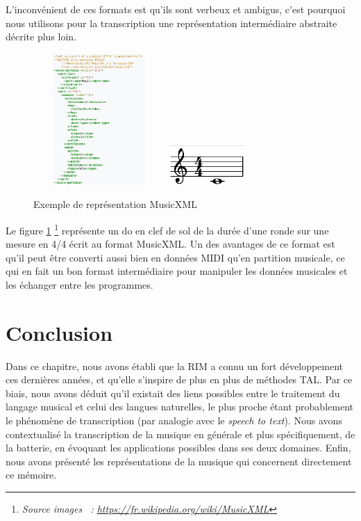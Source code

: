 L’inconvénient de ces formats est qu’ils sont verbeux et ambigus, c’est
pourquoi nous utilisons pour la transcription une représentation intermédiaire
abstraite décrite plus loin.


\begin{figure}[h]
	\centering
	\includegraphics[height=50mm, width=50mm]{
    z_images/1_contexte/6_musicxml_0.png}
    \includegraphics[height=15mm, width=30mm]{
    z_images/1_contexte/6_musicxml_1.png}
	\caption{Exemple de représentation MusicXML} 
	\label{MusicXML}
\end{figure}

Le figure \ref{MusicXML}
\footnote{\textit{Source images~ :
\url{https://fr.wikipedia.org/wiki/MusicXML}}}
représente un do en clef de sol de la durée d’une ronde sur une mesure en 4/4
écrit au format MusicXML.
Un des avantages de ce format est qu’il peut être converti aussi bien en
données MIDI qu’en partition musicale, ce qui en fait un bon format
intermédiaire pour manipuler les données musicales et les échanger entre les
programmes.

\section*{Conclusion}
Dans ce chapitre, nous avons établi que la RIM a connu un fort développement
ces dernières années, et qu’elle s’inspire de plus en plus de méthodes TAL. Par
ce biais, nous avons déduit qu’il existait des liens possibles entre le
traitement du langage musical et celui des langues naturelles, le plus proche
étant probablement le phénomène de transcription (par analogie avec le
\textit{speech to text}). Nous avons contextualisé la transcription de la
musique en générale et plus spécifiquement, de la batterie, en évoquant les
applications possibles dans ses deux domaines. Enfin, nous avons présenté les
représentations de la musique qui concernent directement ce mémoire.
